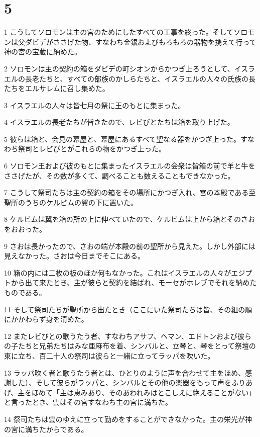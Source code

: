 \chapter{5}

\par 1 こうしてソロモンは主の宮のためにしたすべての工事を終った。そしてソロモンは父ダビデがささげた物、すなわち金銀およびもろもろの器物を携えて行って神の宮の宝蔵に納めた。
\par 2 ソロモンは主の契約の箱をダビデの町シオンからかつぎ上ろうとして、イスラエルの長老たちと、すべての部族のかしらたちと、イスラエルの人々の氏族の長たちをエルサレムに召し集めた。
\par 3 イスラエルの人々は皆七月の祭に王のもとに集まった。
\par 4 イスラエルの長老たちが皆きたので、レビびとたちは箱を取り上げた。
\par 5 彼らは箱と、会見の幕屋と、幕屋にあるすべて聖なる器をかつぎ上った。すなわち祭司とレビびとがこれらの物をかつぎ上った。
\par 6 ソロモン王および彼のもとに集まったイスラエルの会衆は皆箱の前で羊と牛をささげたが、その数が多くて、調べることも数えることもできなかった。
\par 7 こうして祭司たちは主の契約の箱をその場所にかつぎ入れ、宮の本殿である至聖所のうちのケルビムの翼の下に置いた。
\par 8 ケルビムは翼を箱の所の上に伸べていたので、ケルビムは上から箱とそのさおをおおった。
\par 9 さおは長かったので、さおの端が本殿の前の聖所から見えた。しかし外部には見えなかった。さおは今日までそこにある。
\par 10 箱の内には二枚の板のほか何もなかった。これはイスラエルの人々がエジプトから出て来たとき、主が彼らと契約を結ばれ、モーセがホレブでそれを納めたものである。
\par 11 そして祭司たちが聖所から出たとき（ここにいた祭司たちは皆、その組の順にかかわらず身を清めた。
\par 12 またレビびとの歌うたう者、すなわちアサフ、ヘマン、エドトンおよび彼らの子たちと兄弟たちはみな亜麻布を着、シンバルと、立琴と、琴をとって祭壇の東に立ち、百二十人の祭司は彼らと一緒に立ってラッパを吹いた。
\par 13 ラッパ吹く者と歌うたう者とは、ひとりのように声を合わせて主をほめ、感謝した）、そして彼らがラッパと、シンバルとその他の楽器をもって声をふりあげ、主をほめて「主は恵みあり、そのあわれみはとこしえに絶えることがない」と言ったとき、雲はその宮すなわち主の宮に満ちた。
\par 14 祭司たちは雲のゆえに立って勤めをすることができなかった。主の栄光が神の宮に満ちたからである。

